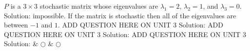 \fi    
\ifnum {} %
    \setlength{\extrarowheight}{0.00cm} $P$ is a $3\times3$ stochastic matrix whose eigenvalues are $\lambda_1 = 2$, $\lambda_2=1$, and $\lambda_3 = 0$. 
    \ifnum {} {\color{DarkBlue} Solution:  impossible. If the matrix is stochastic then all of the eigenvalues are between $-1$ and $1$. 
    } \fi
\fi    
\ifnum {} %
    \setlength{\extrarowheight}{0.00cm} ADD QUESTION HERE ON UNIT 3
    \ifnum {} {\color{DarkBlue} Solution:  
    } \fi
\fi    
\ifnum {} %
    \setlength{\extrarowheight}{0.00cm} ADD QUESTION HERE ON UNIT 3
    \ifnum {} {\color{DarkBlue} Solution:  
    } \fi
\fi    
\ifnum {} %
    \setlength{\extrarowheight}{0.00cm} ADD QUESTION HERE ON UNIT 3
    \ifnum {} {\color{DarkBlue} Solution:  
    } \fi
\fi    
& $\bigcirc$  & $\bigcirc$ \\    